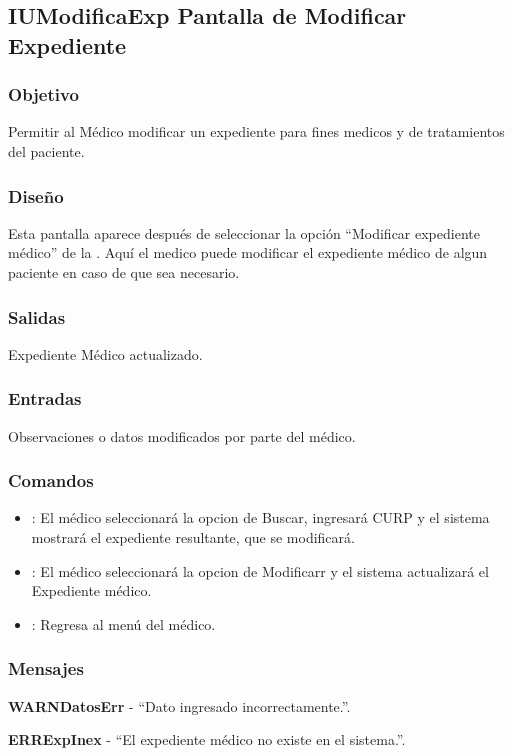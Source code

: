 \subsection{IUModificaExp Pantalla de Modificar Expediente}

\subsubsection{Objetivo}
	Permitir al M\'edico modificar un expediente para fines medicos y de tratamientos del paciente.

\subsubsection{Diseño}
	Esta pantalla aparece despu\'es de seleccionar la opci\'on "`Modificar expediente m\'edico"' de la \label{IUMedico}. Aqu\'i el medico puede modificar el expediente m\'edico de algun paciente en caso de que sea necesario.


\subsubsection{Salidas}

	Expediente M\'edico actualizado.

\subsubsection{Entradas}
Observaciones o datos modificados por parte del m\'edico.

\subsubsection{Comandos}
\begin{itemize}
		\item {}: El m\'edico seleccionar\'a la opcion de Buscar, ingresar\'a CURP y el sistema mostrar\'a el expediente resultante, que se modificar\'a.
		\item {}: El m\'edico seleccionar\'a la opcion de Modificarr y el sistema actualizar\'a el Expediente m\'edico.
		\item {}: Regresa al men\'u del m\'edico.
\end{itemize}

\subsubsection{Mensajes}
	\begin{Citemize}
		\item {\bf WARNDatosErr} - "`Dato ingresado incorrectamente."'.
		\item {\bf ERRExpInex} - "`El expediente m\'edico no existe en el sistema."'.
	\end{Citemize}